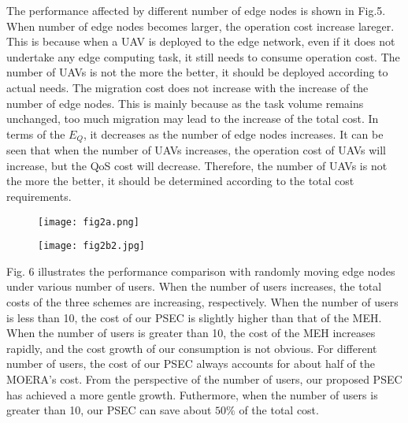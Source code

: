 \documentclass[journal,article,submit,pdftex,moreauthors]{Definitions/mdpi}
\begin{document}
 The performance affected by different  number of edge nodes is shown in   Fig.5.  When number of edge nodes becomes larger, the operation cost  increase lareger. This is because when a UAV is deployed to the edge network, even if it does not undertake any edge computing task, it still needs to consume  operation cost. The number of UAVs is not the more the better, it should be deployed according to actual needs. The migration cost does not increase with the increase of the number of edge nodes. This is mainly because as the task volume remains unchanged, too much migration may lead to the increase of the total cost. In terms of the $E_Q$, it decreases as the number of edge nodes increases.  It can be seen  that when the number of UAVs increases, the operation cost of UAVs will increase, but the QoS cost will decrease. Therefore, the number of UAVs is not the more the better, it should be determined according to the total cost requirements. 

\begin{figure}[H]
\centering
\texttt{[image: fig2a.png]} 

 \centering
\fontsize{6.5}{8}
\end{figure}
\begin{figure}[H]
\centering
\texttt{[image: fig2b2.jpg]} 

 \centering
\fontsize{6.5}{8}
\end{figure}
Fig. 6 illustrates the performance comparison with randomly moving edge nodes under various number of users.   When the number of users increases, the total costs of the three schemes are increasing, respectively. When the number of users is less than 10, the cost of our PSEC is slightly higher than that of the MEH. When the number of users is greater than 10, the cost of the MEH increases rapidly, and the cost growth of our consumption is not obvious. For different number of users, the cost of our PSEC always accounts for about half of the MOERA's cost.  From the perspective of the number of users, our proposed PSEC has achieved a more gentle growth. Futhermore, when the number of users is greater than 10, our PSEC  can save about $50\%$ of the total cost.
\end{document}
